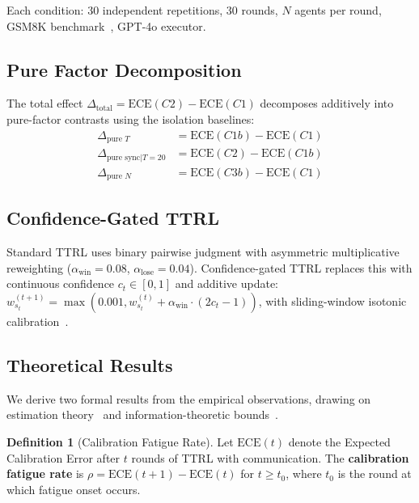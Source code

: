 \documentclass[11pt]{article}
\newcommand{\ECE}{\ensuremath{\mathrm{ECE}}}
\theoremstyle{definition}
\newtheorem{definition}[theorem]{Definition}
\theoremstyle{remark}
\begin{document}
Each condition: 30 independent repetitions, 30 rounds, $N$ agents per round, GSM8K benchmark~\citep{cobbe2021gsm8k}, GPT-4o executor.

\subsection{Pure Factor Decomposition}

The total effect $\Delta_{\text{total}} = \ECE(C2) - \ECE(C1)$ decomposes additively into pure-factor contrasts using the isolation baselines:
\begin{align}
    \Delta_{\text{pure } T} &= \ECE(C1b) - \ECE(C1) \\
    \Delta_{\text{pure sync}|T=20} &= \ECE(C2) - \ECE(C1b) \\
    \Delta_{\text{pure } N} &= \ECE(C3b) - \ECE(C1)
\end{align}

\subsection{Confidence-Gated TTRL}

Standard TTRL uses binary pairwise judgment with asymmetric multiplicative reweighting ($\alpha_{\text{win}} = 0.08$, $\alpha_{\text{lose}} = 0.04$). Confidence-gated TTRL replaces this with continuous confidence $c_t \in [0,1]$ and additive update: $w_{s_t}^{(t+1)} = \max(0.001, w_{s_t}^{(t)} + \alpha_{\text{win}} \cdot (2c_t - 1))$, with sliding-window isotonic calibration~\citep{niculescu2005predicting}.

\subsection{Theoretical Results}

We derive two formal results from the empirical observations, drawing on estimation theory~\citep{lehmann1998theory} and information-theoretic bounds~\citep{cover2012elements}.

\begin{definition}[Calibration Fatigue Rate]
Let $\ECE(t)$ denote the Expected Calibration Error after $t$ rounds of TTRL with communication. The \textbf{calibration fatigue rate} is $\rho = \ECE(t+1) - \ECE(t)$ for $t \geq t_0$, where $t_0$ is the round at which fatigue onset occurs.
\end{definition}
\end{document}

